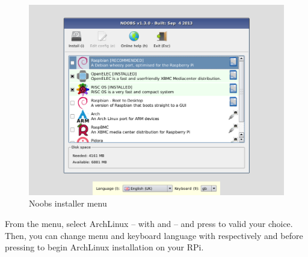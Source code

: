 \begin{figure}[h]
	\centering
	\includegraphics[scale=0.4]{images/NoobsMenu.png}
	\caption{Noobs installer menu}
	\label{figure:NoobsMenu}
\end{figure}

From the menu, select ArchLinux -- with \keys{\arrowkeyup} and 
\keys{\arrowkeydown} -- and press  to valid your choice. Then, you 
can change menu and keyboard language with respectively  and  
before pressing  to begin ArchLinux installation on your RPi.

